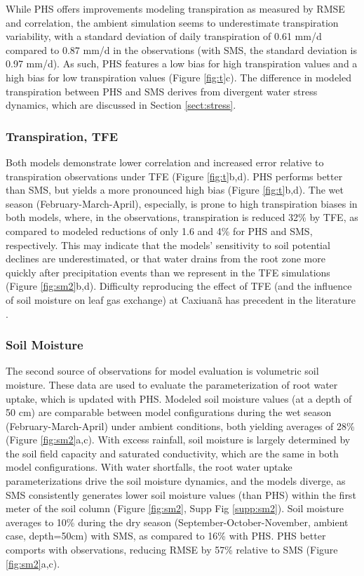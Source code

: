 \documentclass[draft,linenumbers]{agujournal}
\begin{document}
While PHS offers improvements modeling transpiration as measured by RMSE and correlation, the ambient simulation seems to underestimate transpiration variability, with a standard deviation of daily transpiration of 0.61 mm/d compared to 0.87 mm/d in the observations (with SMS, the standard deviation is 0.97 mm/d).
As such, PHS features a low bias for high transpiration values and a high bias for low transpiration values (Figure \ref{fig:t}c).
The difference in modeled transpiration between PHS and SMS derives from divergent water stress dynamics, which are discussed in Section \ref{sect:stress}.

\subsubsection{Transpiration, TFE}
\label{sect:ttfe}
Both models demonstrate lower correlation and increased error relative to transpiration observations under TFE (Figure \ref{fig:t}b,d).
PHS performs better than SMS, but yields a more pronounced high bias (Figure \ref{fig:t}b,d).
The wet season (February-March-April), especially, is prone to high transpiration biases in both models, where, in the observations, transpiration is reduced 32\% by TFE, as compared to modeled reductions of only 1.6 and 4\% for PHS and SMS, respectively.
This may indicate that the models' sensitivity to soil potential declines are underestimated, or that water drains from the root zone more quickly after precipitation events than we represent in the TFE simulations (Figure \ref{fig:sm2}b,d).
Difficulty reproducing the effect of TFE (and the influence of soil moisture on leaf gas exchange) at Caxiuan\~a has precedent in the literature \citep{restrepo2017,powell2013}.

\subsubsection{Soil Moisture}
\label{results:sm}
The second source of observations for model evaluation is volumetric soil moisture. 
These data are used to evaluate the parameterization of root water uptake, which is updated with PHS.
Modeled soil moisture values (at a depth of 50 cm) are comparable between model configurations during the wet season (February-March-April) under ambient conditions, both yielding averages of 28\% (Figure \ref{fig:sm2}a,c).
With excess rainfall, soil moisture is largely determined by the soil field capacity and saturated conductivity, which are the same in both model configurations.
With water shortfalls, the root water uptake parameterizations drive the soil moisture dynamics, and the models diverge, 
as SMS consistently generates lower soil moisture values (than PHS) within the first meter of the soil column (Figure \ref{fig:sm2}, Supp Fig \ref{supp:sm2}).
Soil moisture averages to 10\% during the dry season (September-October-November, ambient case, depth=50cm) with SMS, as compared to 16\% with PHS.
PHS better comports with observations, reducing RMSE by 57\% relative to SMS (Figure \ref{fig:sm2}a,c).
\end{document}
